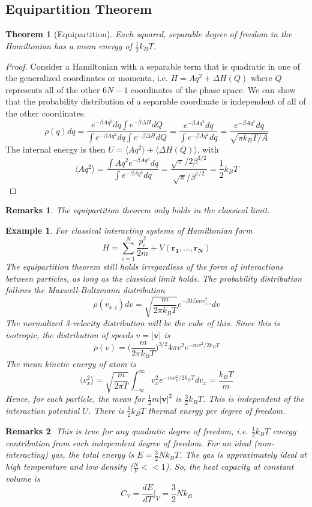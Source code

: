 \documentclass[a4paper]{article}
\newtheorem{eg}{Example}[section]
\newtheorem{remarks}{Remarks}[section]
\theoremstyle{new}
\newtheorem{thm}{Theorem}[section]
\begin{document}
\subsection{Equipartition Theorem}
\begin{thm}[Equipartition]
Each squared, separable degree of freedom in the Hamiltonian has a mean energy of $\frac{1}{2}k_BT$.
\end{thm}
\begin{proof}
Consider a Hamiltonian with a separable term that is quadratic in one of the generalized coordinates or momenta, i.e. $H=Aq^2+\Delta H(Q)$ where $Q$ represents all of the other $6N-1$ coordinates of the phase space. We can show that the probability distribution of a separable coordinate is independent of all of the other coordinates.
$$\rho(q)dq=\frac{e^{-\beta Aq^2}dq\int e^{-\beta\Delta H}dQ}{\int e^{-\beta Aq^2}dq\int e^{-\beta\Delta H}dQ}=\frac{e^{-\beta Aq^2}dq}{\int e^{-\beta Aq^2}dq}=\frac{e^{-\beta Aq^2}dq}{\sqrt{\pi k_BT/A}}$$
The internal energy is then $U=\langle Aq^2\rangle+\langle\Delta H(Q)\rangle$, with
$$\langle Aq^2\rangle=\frac{\int Aq^2e^{-\beta Aq^2}dq}{\int e^{-\beta Aq^2}dq}=\frac{\sqrt{\pi}/2\beta^{3/2}}{\sqrt{\pi}/\beta^{1/2}}=\frac{1}{2}k_BT$$
\end{proof}
\begin{remarks}
The equipartition theorem only holds in the classical limit.
\end{remarks}
\begin{eg}
For classical interacting systems of Hamiltonian form
$$H=\sum_{i=1}^N\frac{p_i^2}{2m}+V(\mathbf{r_1},\dots,\mathbf{r_N})$$
The equipartition theorem still holds irregardless of the form of interactions between particles, as long as the classical limit holds. The probability distribution follows the Maxwell-Boltzmann distribution
$$\rho(v_{x,i})dv=\sqrt{\frac{m}{2\pi k_BT}}e^{-\beta0.5 mv_{x,i}^2}dv$$
The normalized 3-velocity distribution will be the cube of this. Since this is isotropic, the distribution of speeds $v=|\mathbf{v}|$ is
$$\rho(v)=\bigg(\frac{m}{2\pi k_BT}\bigg)^{3/2}4\pi v^2e^{-mv^2/2k_BT}$$
The mean kinetic energy of atom is
$$\langle v_x^2\rangle=\sqrt{\frac{m}{2\pi T}}\int_{-\infty}^\infty v_x^2e^{-mv_x^2/2k_BT}dv_x=\frac{k_BT}{m}$$
Hence, for each particle, the mean for $\frac{1}{2}m|\mathbf{v}|^2$ is $\frac{3}{2}k_BT$. This is independent of the interaction potential $U$. There is $\frac{1}{2}k_BT$ thermal energy per degree of freedom.
\end{eg}
\begin{remarks}
This is true for any quadratic degree of freedom, i.e. $\frac{1}{2}k_BT$ energy contribution from each independent degree of freedom. For an ideal (non-interacting) gas, the total energy is $E=\frac{3}{2}Nk_BT$. The gas is approximately ideal at high temperature and low density ($\frac{N}{V}<<1$). So, the heat capacity at constant volume is
$$C_V=\frac{dE}{dT}\bigg|_V=\frac{3}{2}Nk_B$$
\end{remarks}
\newpage
\end{document}

